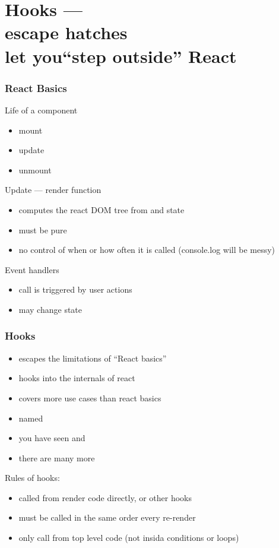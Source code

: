 \section{Hooks ---\\escape hatches \\let you``step outside'' React}

\begin{frame}[fragile] \frametitle{React Basics}
Life of a component
\begin{itemize}
  \item mount
  \item update
  \item unmount
\end{itemize}
Update --- render function
\begin{itemize}
  \item computes the react DOM tree from  and state
  \item must be pure
  \item no control of when or how often it is called (console.log will be messy)
\end{itemize}
\vspace{5mm}
Event handlers
\begin{itemize}
  \item call is triggered by user actions
  \item may change state
\end{itemize}
\end{frame}

\begin{frame}[fragile] \frametitle{Hooks}
\begin{itemize}
  \item escapes the limitations of ``React basics''
  \item hooks into the internals of react
  \item covers more use cases than react basics
  \item named 
  \item you have seen  and 
  \item there are many more
\end{itemize}
\vspace{5mm}
Rules of hooks:
\begin{itemize}
  \item called from render code directly, or other hooks
  \item must be called in the same order every re-render
  \item only call from top level code (not insida conditions or loops)
\end{itemize}
\end{frame}

